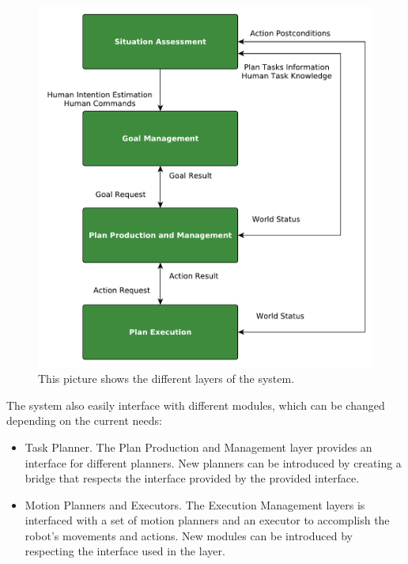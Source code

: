  \begin{figure}[h!]
	\centering
	\includegraphics[scale=0.45]{img/intro/system_architecture.pdf}
	\caption[System architecture]{This picture shows the different layers of the system.}
	\label{fig:intro-system_architecture}
\end{figure}

The system also easily interface with different modules, which can be changed depending on the current needs:
\begin{itemize}
\item Task Planner. The Plan Production and Management layer provides an interface for different planners. New planners can be introduced by creating a bridge that respects the interface provided by the provided interface.
\item Motion Planners and Executors. The Execution Management layers is interfaced with a set of motion planners and an executor to accomplish the robot's movements and actions. New modules can be introduced by respecting the interface used in the layer.
\end{itemize}


